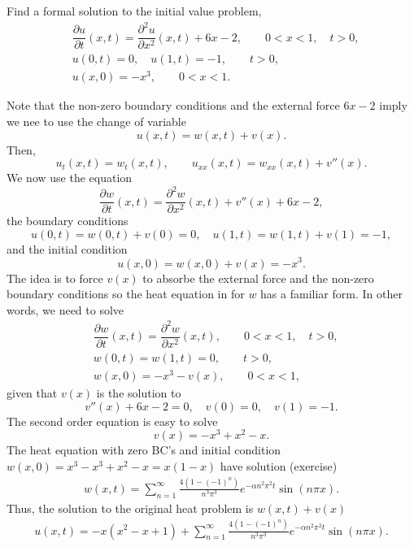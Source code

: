 \documentclass[11pt]{article}
\begin{document}
\begin{problem}
Find a formal solution to the initial value problem,
\begin{equation*} \begin{split}
& \dfrac{\partial u }{\partial t } (x,t) = \dfrac{\partial^2 u}{\partial x^2}(x,t) + 6 x -2, \qquad 0<x<1, \quad t>0, \\
& u(0,t) = 0, \quad u(1,t)= -1, \qquad t>0, \\
& u(x,0) = -x^{3}, \qquad 0<x<1.
\end{split}\end{equation*}
\end{problem}
\begin{solution}
Note that the non-zero boundary conditions and the external force $6x-2$ imply we nee to use the change of variable
\[u(x,t)=w(x,t)+v(x).\]
Then,
\[u_{t}(x,t)=w_{t}(x,t), \qquad u_{xx}(x,t)=w_{xx}(x,t)+v''(x).\]
We now use the equation
\[\dfrac{\partial w }{\partial t } (x,t) = \dfrac{\partial^2 w}{\partial x^2}(x,t) + v''(x) + 6 x -2,\]
the boundary conditions
\[u(0,t) = w(0,t) + v(0) = 0, \quad u(1,t)= w(1,t) + v(1) = -1,\]
and the initial condition
\[u(x,0) = w(x,0) + v(x) = -x^{3}.\]
The idea is to force $v(x)$ to absorbe the external force and the non-zero boundary conditions so the heat equation in for $w$ has a familiar form. In other words, we need to solve
\begin{equation*} \begin{split}
& \dfrac{\partial w }{\partial t } (x,t) = \dfrac{\partial^2 w}{\partial x^2}(x,t), \qquad 0<x<1, \quad t>0, \\
& w(0,t) = w(1,t)= 0, \qquad t>0, \\
& w(x,0) = -x^{3} - v(x), \qquad 0<x<1,
\end{split}\end{equation*}
given that $v(x)$ is the solution to
\begin{equation}
v''(x)+6x-2=0,\quad v(0)=0, \quad v(1)=-1.
\end{equation}
The second order equation is easy to solve
\[v(x)=-x^{3}+x^{2}-x.\]
The heat equation with zero BC's and initial condition $w(x,0)=x^{3}-x^{3}+x^{2}-x=x(1-x)$ have solution (exercise)
\begin{eqnarray*}
w(x,t) = \sum_{n=1}^{\infty}\frac{4(1-(-1)^{n})}{n^{3}\pi^{3}}e^{-\alpha n^{2}\pi^{2}t}\sin (n\pi x).
\end{eqnarray*}
Thus, the solution to the original heat problem is $w(x,t)+v(x)$
\begin{eqnarray*}
\boxed{u(x,t) = -x(x^{2}-x+1)+\sum_{n=1}^{\infty}\frac{4(1-(-1)^{n})}{n^{3}\pi^{3}}e^{-\alpha n^{2}\pi^{2}t}\sin (n\pi x)}.
\end{eqnarray*}
\end{solution}
\end{document}

